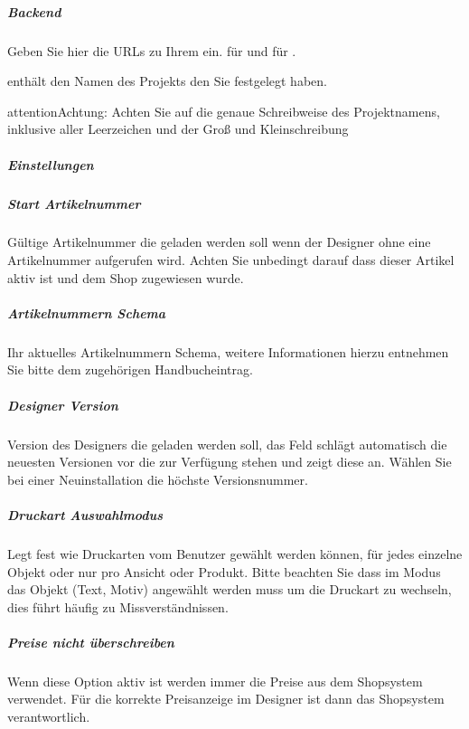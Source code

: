 \documentclass[letterpaper,10pt,ngerman]{sphinxmanual}
\begin{document}
\subparagraph{Backend}
\label{\detokenize{modules/oxid/settings:backend}}
Geben Sie hier die URLs zu Ihrem {\hyperref[\detokenize{tools/backend::doc}]{}} ein. 
für  und  für .

 enthält den Namen des {\hyperref[\detokenize{tools/epstool::doc}]{}} Projekts den Sie festgelegt haben.

\begin{sphinxadmonition}{attention}{Achtung:}
Achten Sie auf die genaue Schreibweise des Projektnamens, inklusive aller Leerzeichen und der Groß\sphinxhyphen{} und Kleinschreibung
\end{sphinxadmonition}


\subparagraph{Einstellungen}
\label{\detokenize{modules/oxid/settings:einstellungen}}

\subparagraph{Start Artikelnummer}
\label{\detokenize{modules/oxid/settings:start-artikelnummer}}
Gültige Artikelnummer die geladen werden soll wenn der Designer ohne eine Artikelnummer aufgerufen wird. Achten Sie unbedingt
darauf dass dieser Artikel aktiv ist und dem Shop zugewiesen wurde.


\subparagraph{Artikelnummern Schema}
\label{\detokenize{modules/oxid/settings:artikelnummern-schema}}
Ihr aktuelles Artikelnummern Schema, weitere Informationen hierzu entnehmen Sie bitte dem zugehörigen Handbucheintrag.


\subparagraph{Designer Version}
\label{\detokenize{modules/oxid/settings:designer-version}}
Version des Designers die geladen werden soll, das Feld schlägt automatisch die neuesten Versionen vor die zur Verfügung
stehen und zeigt diese an. Wählen Sie bei einer Neuinstallation die höchste Versionsnummer.


\subparagraph{Druckart Auswahlmodus}
\label{\detokenize{modules/oxid/settings:druckart-auswahlmodus}}
Legt fest wie Druckarten vom Benutzer gewählt werden können, für jedes einzelne Objekt oder nur pro Ansicht oder Produkt.
Bitte beachten Sie dass im  Modus das Objekt (Text, Motiv) angewählt werden muss um die Druckart zu wechseln,
dies führt häufig zu Missverständnissen.


\subparagraph{Preise nicht überschreiben}
\label{\detokenize{modules/oxid/settings:preise-nicht-uberschreiben}}
Wenn diese Option aktiv ist werden immer die Preise aus dem Shopsystem verwendet.
Für die korrekte Preisanzeige im Designer ist dann das Shopsystem verantwortlich.
\end{document}
